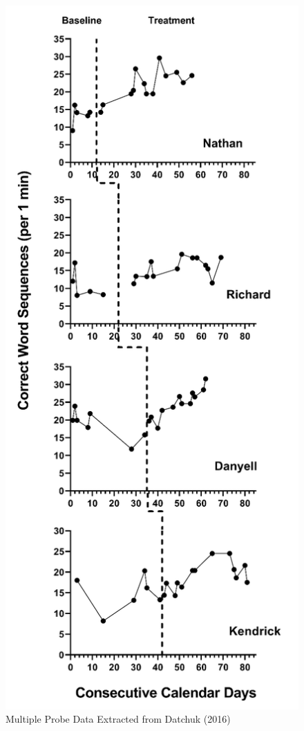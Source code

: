 \documentclass[
]{book}
\begin{document}
\begin{figure}
\includegraphics[width=0.6\linewidth]{images/Datchuk2016} \caption{Multiple Probe Data Extracted from Datchuk (2016)}\label{fig:Datchuk-raw-2016}
\end{figure}
\end{document}
